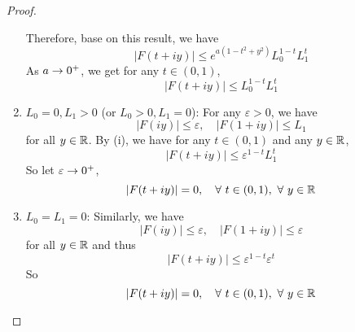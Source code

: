\begin{proof}
\begin{enumerate}[label=(\roman*)]
		\noindent Therefore, base on this result, we have
		\begin{equation*}
			|F(t+i y)| \leq e^{a\left(1-t^2+y^2\right)} L_0^{1-t} L_1^t
		\end{equation*}
		As $a \rightarrow 0^+$, we get for any $t \in (0,1)$,
		\begin{equation*}
			|F(t+i y)| \leq L_0^{1-t} L_1^t
		\end{equation*}

		\item $L_0 = 0, L_1 > 0$ (or $L_0> 0, L_1 = 0$): For any $\varepsilon > 0$, we have
		\begin{equation*}
			|F(i y)| \leq \varepsilon, \quad|F(1+i y)| \leq L_1
		\end{equation*}
		for all $y \in \mathbb{R}$. By (i), we have for any $t \in (0,1)$ and any $y \in \mathbb{R}$,
		\begin{equation*}
			|F(t+i y)| \leq \varepsilon^{1-t} L_1^t
		\end{equation*}
		So let $\varepsilon \rightarrow 0^+$,
		\begin{equation*}
			|F(t+i y)| = 0,\quad \forall~t \in (0,1),~\forall~ y \in \mathbb{R}
		\end{equation*}

		\item $L_0 = L_1 = 0$: Similarly, we have
		\begin{equation*}
			|F(i y)| \leq \varepsilon, \quad|F(1+i y)| \leq \varepsilon
		\end{equation*}
		for all $y \in \mathbb{R}$ and thus
		\begin{equation*}
			|F(t+i y)| \leq \varepsilon^{1-t} \varepsilon^t
		\end{equation*}
		So
		\begin{equation*}
			|F(t+i y)| = 0,\quad \forall~t \in (0,1),~\forall~ y \in \mathbb{R}
		\end{equation*}
	\end{enumerate}
\end{proof}

